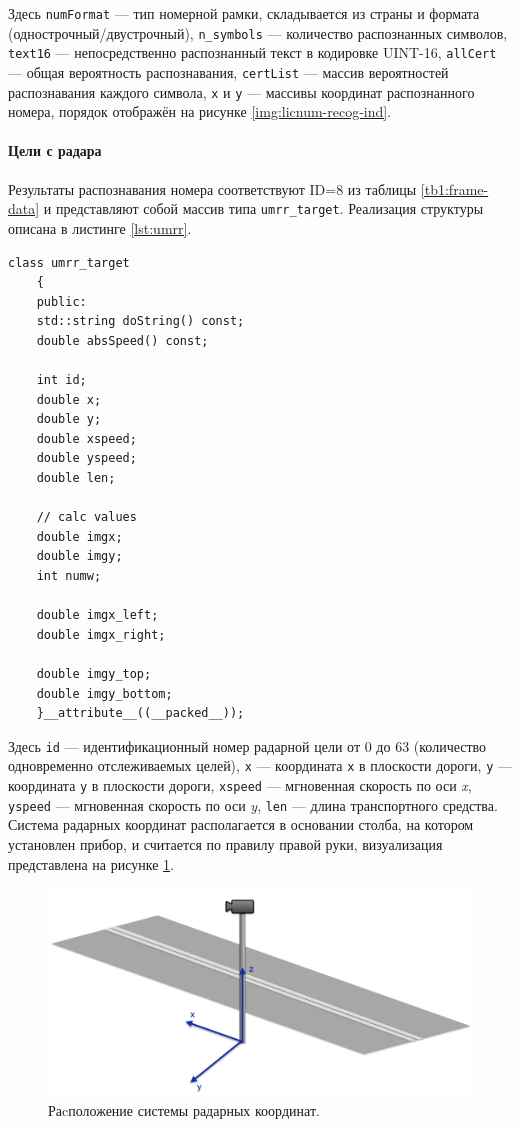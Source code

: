 \documentclass[specification,annotation,times]{itmo-student-thesis}
\begin{document}
	
	Здесь \texttt{numFormat} --- тип номерной рамки, складывается из страны  и формата (однострочный/двустрочный), \texttt{n\_symbols} --- количество распознанных символов,  \texttt{text16} --- непосредственно распознанный текст в кодировке UINT-16,  \texttt{allCert} --- общая вероятность распознавания,  \texttt{certList} --- массив вероятностей распознавания каждого символа,  \texttt{x} и \texttt{y} --- массивы координат распознанного номера, порядок отображён на рисунке \ref{img:licnum-recog-ind}.
	
	
	\paragraph{Цели с радара}
	Результаты распознавания номера соответствуют ID=8 из таблицы \ref{tb1:frame-data} и представляют собой массив типа \texttt{umrr\_target}. Реализация структуры описана в листинге \ref{lst:umrr}.
	
	\begin{lstlisting}[float=!h,caption={Реализация структуры \texttt{umrr\_target}.},label={lst:umrr}]
	class umrr_target
	{
	public:
	std::string doString() const;
	double absSpeed() const;
	
	int id;
	double x;
	double y;
	double xspeed;
	double yspeed;
	double len;
	
	// calc values
	double imgx;
	double imgy;
	int numw;
	
	double imgx_left;
	double imgx_right;
	
	double imgy_top;
	double imgy_bottom;
	}__attribute__((__packed__));
	\end{lstlisting}
	
	Здесь \texttt{id} --- идентификационный номер радарной цели от 0 до 63 (количество одновременно отслеживаемых целей), \texttt{x} --- координата \texttt{x} в плоскости дороги, \texttt{y} --- координата \texttt{y} в плоскости дороги,  \texttt{xspeed} --- мгновенная скорость по оси \textit{x},  \texttt{yspeed} --- мгновенная скорость по оси \textit{y},  \texttt{len}  --- длина транспортного средства. Система радарных координат располагается в основании столба, на котором установлен прибор, и считается по правилу правой руки, визуализация представлена на рисунке \ref{img:road-coords}.
	
	\begin{figure}[!ht]
		\caption{Раcположение системы радарных координат.}\label{img:road-coords}
		\includegraphics[width=0.85\linewidth]{../png/road_coords.png}
		\centering
	\end{figure}
	
\end{document}
